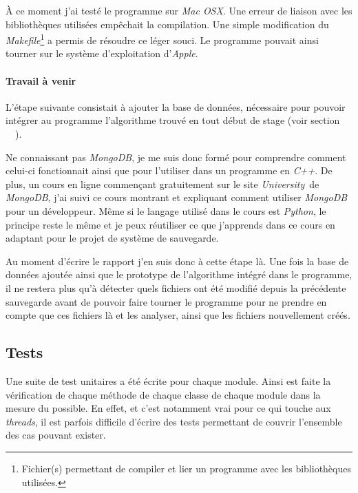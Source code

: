 \documentclass[a4paper,10pt, twoside]{report}
\begin{document}
\begin{spacing}{1.2}
\`A ce moment j'ai test\'e le programme sur \textit{Mac OSX}. Une erreur de
liaison avec les biblioth\`eques utilis\'ees emp\^echait la compilation. Une
simple modification du \textit{Makefile}\footnote{Fichier(s) permettant de
compiler et lier un programme avec les biblioth\`eques utilis\'ees.} a permis
de r\'esoudre ce l\'eger souci. Le programme pouvait ainsi tourner sur le
syst\`eme d'exploitation d'\textit{Apple}.

\paragraph{Travail \`a venir}

L'\'etape suivante consistait \`a ajouter la base de donn\'ees, n\'ecessaire
pour pouvoir int\'egrer au programme l'algorithme trouv\'e en tout d\'ebut de
stage (voir section \flqq~~\frqq).

Ne connaissant pas \textit{MongoDB}, je me suis donc form\'e pour comprendre
comment celui-ci fonctionnait ainsi que pour l'utiliser dans un programme en
\textit{C++}. De plus, un cours en ligne commen\c{c}ant gratuitement sur le site
\flqq\textit{University}\frqq~de \textit{MongoDB}\cite{refMongoDBUniversity},
j'ai suivi ce cours montrant et expliquant comment utiliser \textit{MongoDB}
pour un d\'eveloppeur. M\^eme si le langage utilis\'e dans le cours est
\textit{Python}, le principe reste le m\^eme et je peux r\'eutiliser ce que
j'apprends dans ce cours en adaptant pour le projet de syst\`eme de sauvegarde.

Au moment d'\'ecrire le rapport j'en suis donc \`a cette \'etape l\`a. Une fois
la base de donn\'ees ajout\'ee ainsi que le prototype de l'algorithme
int\'egr\'e dans le programme, il ne restera plus qu'\`a d\'etecter quels
fichiers ont \'et\'e modifi\'e depuis la pr\'ec\'edente sauvegarde avant de
pouvoir faire tourner le programme pour ne prendre en compte que ces fichiers
l\`a et les analyser, ainsi que les fichiers nouvellement cr\'e\'es.

\subsection{Tests}
Une suite de test unitaires a \'et\'e \'ecrite pour chaque module. Ainsi est
faite la v\'erification de chaque m\'ethode de chaque classe de chaque module
dans la mesure du possible. En effet, et c'est notamment vrai pour ce qui touche
aux \textit{threads}, il est parfois difficile d'\'ecrire des tests permettant
de couvrir l'ensemble des cas pouvant exister.


\end{spacing}
\end{document}
